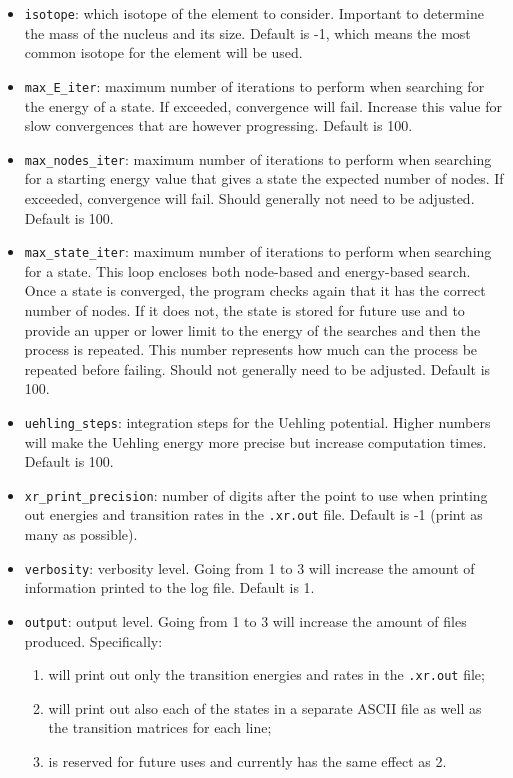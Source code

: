 \documentclass[]{article}
\begin{document}
\begin{itemize}
	\item \texttt{isotope}: which isotope of the element to consider. Important to determine the mass of the nucleus and its size. Default is -1, which means the most common isotope for the element will be used.
	\item \texttt{max\_E\_iter}: maximum number of iterations to perform when searching for the energy of a state. If exceeded, convergence will fail. Increase this value for slow convergences that are however progressing. Default is 100.
	\item \texttt{max\_nodes\_iter}: maximum number of iterations to perform when searching for a starting energy value that gives a state the expected number of nodes. If exceeded, convergence will fail. Should generally not need to be adjusted. Default is 100.
	\item \texttt{max\_state\_iter}: maximum number of iterations to perform when searching for a state. This loop encloses both node-based and energy-based search. Once a state is converged, the program checks again that it has the correct number of nodes. If it does not, the state is stored for future use and to provide an upper or lower limit to the energy of the searches and then the process is repeated. This number represents how much can the process be repeated before failing. Should not generally need to be adjusted. Default is 100.
	\item \texttt{uehling\_steps}: integration steps for the Uehling potential. Higher numbers will make the Uehling energy more precise but increase computation times. Default is 100.
	\item \texttt{xr\_print\_precision}: number of digits after the point to use when printing out energies and transition rates in the \texttt{.xr.out} file. Default is -1 (print as many as possible).
	\item \texttt{verbosity}: verbosity level. Going from 1 to 3 will increase the amount of information printed to the log file. Default is 1.
	\item \texttt{output}: output level. Going from 1 to 3 will increase the amount of files produced. Specifically:
	\begin{enumerate}
		\item will print out only the transition energies and rates in the \texttt{.xr.out} file;
		\item will print out also each of the states in a separate ASCII file as well as the transition matrices for each line;
		\item is reserved for future uses and currently has the same effect as 2.
	\end{enumerate}
\end{itemize}
\end{document}
